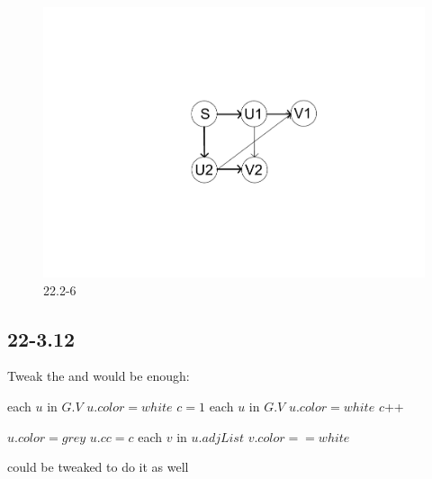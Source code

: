\documentclass[]{article}
\begin{document}
\begin{figure}
	\centering
	\includegraphics[width=\linewidth]{2226}
	\caption{22.2-6}
	\label{fig:22.2-6}
\end{figure}

\subsection{22-3.12}

Tweak the  and  would be enough:

\begin{codebox}
	
	\li	\For each $u$ in $G.V$
	\li \Do $u.color = white$
	\End
	\li $c=1$
	\li	\For each $u$ in $G.V$
	\li \Do \If $u.color = white$
	\li \Then {}
	\li $c$++
	\End
	\End
	
\end{codebox}

\begin{codebox}
	
	\li $u.color = grey$
	\li $u.cc = c$
	\li	\For each $v$ in $u.adjList$
	\li \Do \If $v.color == white$
	\li 	\Then {}
	\End
	\End
	
\end{codebox}

 could be tweaked to do it as well
\end{document}
